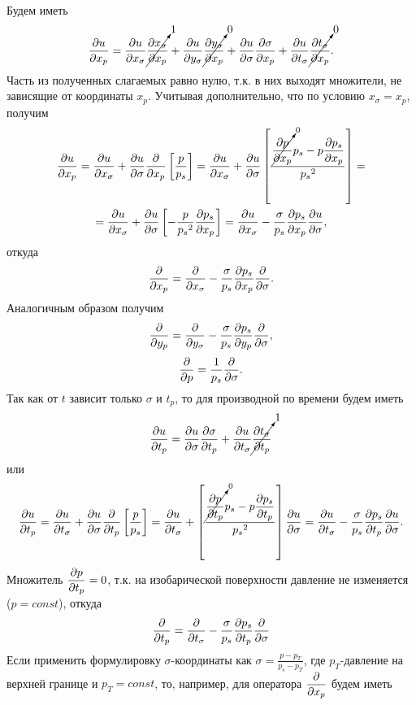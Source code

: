 Будем иметь
\begin{equation*}
    \pd{u}{x_p}=
     \pd{u}{x_{\sigma}} \cancelto{1}{ \pd{x_{\sigma}}{x_p} }+
    \pd{u}{y_{\sigma}}\cancelto{0}{\pd{y_{\sigma}}{x_p}}+
    \pd{u}{\sigma}\pd{\sigma}{x_p}+
    \pd{u}{t_{\sigma}}\cancelto{0}{\pd{t_{\sigma}}{x_p}}.
\end{equation*}
Часть из полученных слагаемых равно нулю, т.к. в них выходят множители, не зависящие от координаты $x_p$. Учитывая дополнительно, что по условию $x_{\sigma}=x_p$, получим
\begin{multline*}
    \pd{u}{x_p}=\pd{u}{x_{\sigma}}+
        \pd{u}{\sigma}\pd{}{x_p} \left[ \frac{p}{p_s} \right] = 
        \pd{u}{x_{\sigma}}+
        \pd{u}{\sigma} \left[ \frac{ \cancelto{0}{\pd{p}{x_p}}p_s - p\pd{p_s}{x_p} } { {p_s}^2 } \right] = \\
        = \pd{u}{x_{\sigma}} + 
        \pd{u}{\sigma} \left[ -\frac{p}{{p_s}^2} \pd{p_s}{x_p} \right] = 
        \pd{u}{x_{\sigma}} - \frac{\sigma}{p_s}\pd{p_s}{x_p}\pd{u}{\sigma},
\end{multline*}
откуда
\begin{equation}
    \label{eq:sigma2px}
    \pd{}{x_p}=\pd{}{x_{\sigma}}-\frac{\sigma}{p_s}\pd{p_s}{x_p}\pd{}{\sigma}.
\end{equation}
Аналогичным образом получим 
\begin{equation}
    \label{eq:sigma2py}
    \pd{}{y_p}=\pd{}{y_{\sigma}}-\frac{\sigma}{p_s}\pd{p_s}{y_p}\pd{}{\sigma},
\end{equation}
\begin{equation}
    \label{eq:sigma2pp}
    \pd{}{p}= \frac{1}{p_s}\pd{}{\sigma}.
\end{equation}
Так как от $t$ зависит только $\sigma$ и $t_p$, то для производной по времени будем иметь
\begin{equation*}
    \pd{u}{t_p}=
    \pd{u}{\sigma}\pd{\sigma}{t_p}+
    \pd{u}{t_{\sigma}} \cancelto{1}{\pd{t_{\sigma}}{t_p}} %
\end{equation*}
 или
 \begin{multline*}
    \pd{u}{t_p}=\pd{u}{t_{\sigma}}+
        \pd{u}{\sigma}\pd{}{t_p} \left[ \frac{p}{p_s} \right] = 
        \pd{u}{t_{\sigma}} + 
        \left[ \frac{ \cancelto{0}{\pd{p}{t_p}}p_s - 
        p\pd{p_s}{t_p} } { {p_s}^2 } \right] \pd{u}{\sigma} 
        = \pd{u}{t_{\sigma}} - 
        \frac{\sigma}{p_s}\pd{p_s}{t_p}\pd{u}{\sigma}.
\end{multline*}
Множитель $\pd{p}{t_p}=0$, т.к. на изобарической поверхности давление не изменяется ($p=const$), откуда
\begin{equation}
    \label{eq:sigma2pt}
    \pd{}{t_p}= \pd{}{t_{\sigma}} - \frac{\sigma}{p_s} \pd{p_s}{t_p} \pd{}{\sigma}
\end{equation}
Если применить формулировку $\sigma$-координаты как  $\sigma=\frac{p-p_T}{p_s-p_T}$, где $p_T$-давление на верхней границе и $p_T=const$, то, например, для оператора $\pd{}{x_p}$ будем иметь


